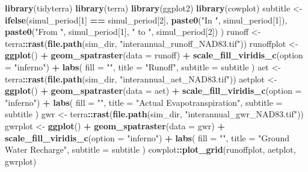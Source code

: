 \documentclass[
]{book}
\newenvironment{Shaded}{\begin{snugshade}}{\end{snugshade}}
\newcommand{\AttributeTok}[1]{\textcolor[rgb]{0.13,0.29,0.53}{#1}}
\newcommand{\DecValTok}[1]{\textcolor[rgb]{0.00,0.00,0.81}{#1}}
\newcommand{\FunctionTok}[1]{\textcolor[rgb]{0.13,0.29,0.53}{\textbf{#1}}}
\newcommand{\NormalTok}[1]{#1}
\newcommand{\OtherTok}[1]{\textcolor[rgb]{0.56,0.35,0.01}{#1}}
\newcommand{\SpecialCharTok}[1]{\textcolor[rgb]{0.81,0.36,0.00}{\textbf{#1}}}
\newcommand{\StringTok}[1]{\textcolor[rgb]{0.31,0.60,0.02}{#1}}
\begin{document}
\begin{Shaded}
\begin{Highlighting}[]
\FunctionTok{library}\NormalTok{(tidyterra)}
\FunctionTok{library}\NormalTok{(terra)}
\FunctionTok{library}\NormalTok{(ggplot2)}
\FunctionTok{library}\NormalTok{(cowplot)}
\NormalTok{subtitle }\OtherTok{\textless{}{-}} \FunctionTok{ifelse}\NormalTok{(simul\_period[}\DecValTok{1}\NormalTok{] }\SpecialCharTok{==}\NormalTok{ simul\_period[}\DecValTok{2}\NormalTok{],}
  \FunctionTok{paste0}\NormalTok{(}\StringTok{"In "}\NormalTok{, simul\_period[}\DecValTok{1}\NormalTok{]),}
  \FunctionTok{paste0}\NormalTok{(}\StringTok{"From "}\NormalTok{, simul\_period[}\DecValTok{1}\NormalTok{], }\StringTok{" to "}\NormalTok{, simul\_period[}\DecValTok{2}\NormalTok{])}
\NormalTok{)}
\NormalTok{runoff }\OtherTok{\textless{}{-}}\NormalTok{ terra}\SpecialCharTok{::}\FunctionTok{rast}\NormalTok{(}\FunctionTok{file.path}\NormalTok{(sim\_dir, }\StringTok{"interannual\_runoff\_NAD83.tif"}\NormalTok{))}
\NormalTok{runoffplot }\OtherTok{\textless{}{-}} \FunctionTok{ggplot}\NormalTok{() }\SpecialCharTok{+}
  \FunctionTok{geom\_spatraster}\NormalTok{(}\AttributeTok{data =}\NormalTok{ runoff) }\SpecialCharTok{+}
  \FunctionTok{scale\_fill\_viridis\_c}\NormalTok{(}\AttributeTok{option =} \StringTok{"inferno"}\NormalTok{) }\SpecialCharTok{+}
  \FunctionTok{labs}\NormalTok{(}
    \AttributeTok{fill =} \StringTok{""}\NormalTok{,}
    \AttributeTok{title =} \StringTok{"Runoff"}\NormalTok{,}
    \AttributeTok{subtitle =}\NormalTok{ subtitle}
\NormalTok{  )}
\NormalTok{aet }\OtherTok{\textless{}{-}}\NormalTok{ terra}\SpecialCharTok{::}\FunctionTok{rast}\NormalTok{(}\FunctionTok{file.path}\NormalTok{(sim\_dir, }\StringTok{"interannual\_aet\_NAD83.tif"}\NormalTok{))}
\NormalTok{aetplot }\OtherTok{\textless{}{-}} \FunctionTok{ggplot}\NormalTok{() }\SpecialCharTok{+}
  \FunctionTok{geom\_spatraster}\NormalTok{(}\AttributeTok{data =}\NormalTok{ aet) }\SpecialCharTok{+}
  \FunctionTok{scale\_fill\_viridis\_c}\NormalTok{(}\AttributeTok{option =} \StringTok{"inferno"}\NormalTok{) }\SpecialCharTok{+}
  \FunctionTok{labs}\NormalTok{(}
    \AttributeTok{fill =} \StringTok{""}\NormalTok{,}
    \AttributeTok{title =} \StringTok{"Actual Evapotranspiration"}\NormalTok{,}
    \AttributeTok{subtitle =}\NormalTok{ subtitle}
\NormalTok{  )}
\NormalTok{gwr }\OtherTok{\textless{}{-}}\NormalTok{ terra}\SpecialCharTok{::}\FunctionTok{rast}\NormalTok{(}\FunctionTok{file.path}\NormalTok{(sim\_dir, }\StringTok{"interannual\_gwr\_NAD83.tif"}\NormalTok{))}
\NormalTok{gwrplot }\OtherTok{\textless{}{-}} \FunctionTok{ggplot}\NormalTok{() }\SpecialCharTok{+}
  \FunctionTok{geom\_spatraster}\NormalTok{(}\AttributeTok{data =}\NormalTok{ gwr) }\SpecialCharTok{+}
  \FunctionTok{scale\_fill\_viridis\_c}\NormalTok{(}\AttributeTok{option =} \StringTok{"inferno"}\NormalTok{) }\SpecialCharTok{+}
  \FunctionTok{labs}\NormalTok{(}
    \AttributeTok{fill =} \StringTok{""}\NormalTok{,}
    \AttributeTok{title =} \StringTok{"Ground Water Recharge"}\NormalTok{,}
    \AttributeTok{subtitle =}\NormalTok{ subtitle}
\NormalTok{  )}
\NormalTok{cowplot}\SpecialCharTok{::}\FunctionTok{plot\_grid}\NormalTok{(runoffplot, aetplot, gwrplot)}
\end{Highlighting}
\end{Shaded}
\end{document}
